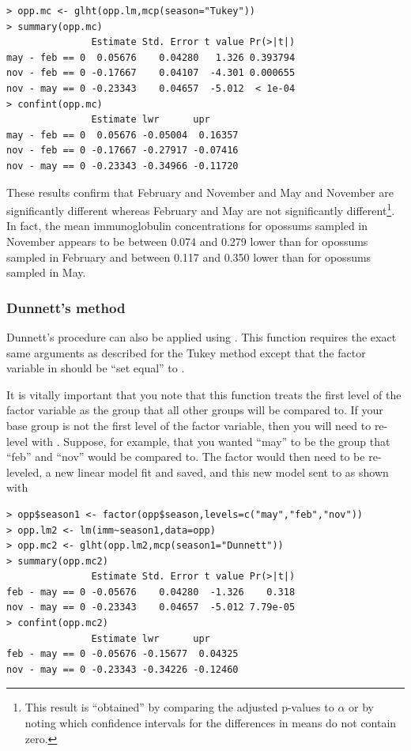 \documentclass[10pt,openany]{book}\usepackage[]{graphicx}\usepackage[]{color}
\makeatletter
\newenvironment{kframe}{%
 \def\at@end@of@kframe{}%
 \ifinner\ifhmode%
  \def\at@end@of@kframe{\end{minipage}}%
  \begin{minipage}{\columnwidth}%
 \fi\fi%
 \def\FrameCommand##1{\hskip\@totalleftmargin \hskip-\fboxsep
 \colorbox{shadecolor}{##1}\hskip-\fboxsep
     \hskip-\linewidth \hskip-\@totalleftmargin \hskip\columnwidth}%
 \MakeFramed {\advance\hsize-\width
   \@totalleftmargin\z@ \linewidth\hsize
   \@setminipage}}%
 {\par\unskip\endMakeFramed%
 \at@end@of@kframe}
\newenvironment{knitrout}{}{} %
\makeatother
\begin{document}
\begin{knitrout}
\color{fgcolor}\begin{kframe}
\begin{verbatim}
> opp.mc <- glht(opp.lm,mcp(season="Tukey"))
> summary(opp.mc)
               Estimate Std. Error t value Pr(>|t|)
may - feb == 0  0.05676    0.04280   1.326 0.393794
nov - feb == 0 -0.17667    0.04107  -4.301 0.000655
nov - may == 0 -0.23343    0.04657  -5.012  < 1e-04
> confint(opp.mc)
               Estimate lwr      upr     
may - feb == 0  0.05676 -0.05004  0.16357
nov - feb == 0 -0.17667 -0.27917 -0.07416
nov - may == 0 -0.23343 -0.34966 -0.11720
\end{verbatim}
\end{kframe}
\end{knitrout}
These results confirm that February and November and May and November are significantly different whereas February and May are not significantly different\footnote{This result is ``obtained'' by comparing the adjusted p-values to $\alpha$ or by noting which confidence intervals for the differences in means do not contain zero.}.  In fact, the mean immunoglobulin concentrations for opossums sampled in November appears to be between 0.074 and 0.279 lower than for opossums sampled in February and between 0.117 and 0.350 lower than for opossums sampled in May.


\subsubsection*{Dunnett's method}
Dunnett's procedure can also be applied using .  This function requires the exact same arguments as described for the Tukey method except that the factor variable in  should be ``set equal'' to .

It is vitally important that you note that this function treats the first level of the factor variable as the group that all other groups will be compared to.  If your base group is not the first level of the factor variable, then you will need to re-level with .  Suppose, for example, that you wanted ``may'' to be the group that ``feb'' and ``nov'' would be compared to.  The factor would then need to be re-leveled, a new linear model fit and saved, and this new model sent to  as shown with

\begin{knitrout}
\color{fgcolor}\begin{kframe}
\begin{verbatim}
> opp$season1 <- factor(opp$season,levels=c("may","feb","nov"))
> opp.lm2 <- lm(imm~season1,data=opp)
> opp.mc2 <- glht(opp.lm2,mcp(season1="Dunnett"))
> summary(opp.mc2)
               Estimate Std. Error t value Pr(>|t|)
feb - may == 0 -0.05676    0.04280  -1.326    0.318
nov - may == 0 -0.23343    0.04657  -5.012 7.79e-05
> confint(opp.mc2)
               Estimate lwr      upr     
feb - may == 0 -0.05676 -0.15677  0.04325
nov - may == 0 -0.23343 -0.34226 -0.12460
\end{verbatim}
\end{kframe}
\end{knitrout}
\end{document}
